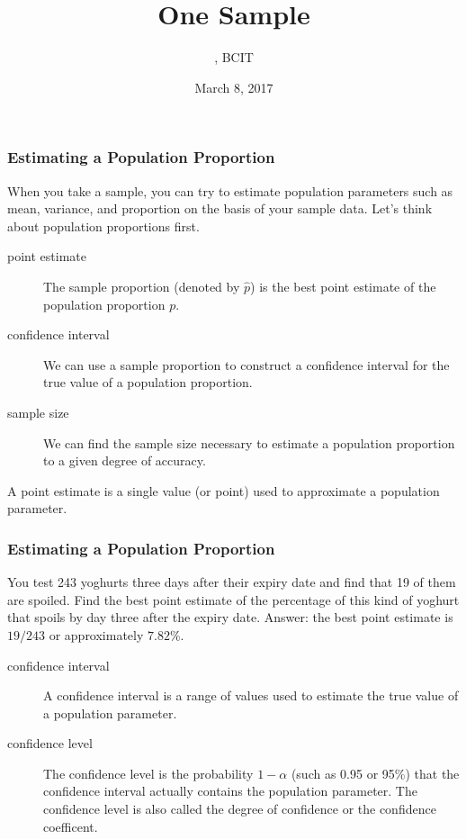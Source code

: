 \documentclass[xcolor=dvipsnames]{beamer}
\title{One Sample}
\subtitle{{\CourseNumber}, BCIT}
\author{\CourseName}
\date{March 8, 2017}
\begin{document}
\begin{frame}
  \titlepage
\end{frame}

\begin{frame}
  \frametitle{Estimating a Population Proportion}
When you take a sample, you can try to estimate population parameters
such as mean, variance, and proportion on the basis of your sample
data. Let's think about population proportions first.
\begin{description}
\item[point estimate] The sample proportion (denoted by $\hat{p}$) is
  the best point estimate of the population proportion $p$.
\item[confidence interval] We can use a sample proportion to construct
  a confidence interval for the true value of a population proportion.
\item[sample size] We can find the sample size necessary to estimate a
  population proportion to a given degree of accuracy.
\end{description}
A \alert{point estimate} is a single value (or point) used to
approximate a population parameter.
\end{frame}

\begin{frame}
  \frametitle{Estimating a Population Proportion}
 You test 243 yoghurts three days after their
expiry date and find that 19 of them are spoiled. Find the best point
estimate of the percentage of this kind of yoghurt that spoils by day
three after the expiry date. Answer: the best point estimate is
$19/243$ or approximately $7.82$\%.

\bigskip

\begin{description}
\item[confidence interval] A confidence interval is a range of values
  used to estimate the true value of a population parameter. 
\item[confidence level] The confidence level is the probability
  $1-\alpha$ (such as 0.95 or 95\%) that the confidence interval
  actually contains the population parameter. The confidence level is
  also called the degree of confidence or the confidence coefficent.
\end{description}
\end{frame}
\end{document}
